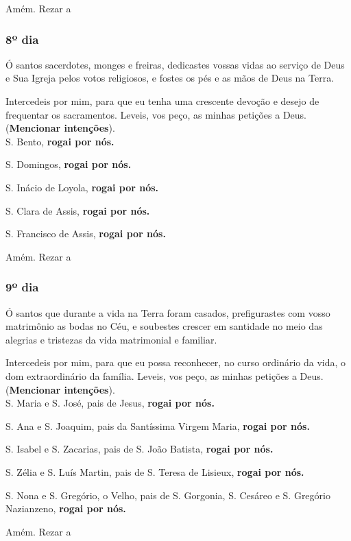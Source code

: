 \documentclass[a4paper,14pt]{extarticle} \usepackage[utf8]{inputenc}
\begin{document}
Amém. Rezar a 
\subsubsection{8º dia}

Ó santos sacerdotes, monges e freiras, dedicastes vossas vidas ao serviço de Deus e Sua Igreja pelos votos religiosos, e fostes os pés e as mãos de Deus na Terra.

Intercedeis por mim, para que eu tenha uma crescente devoção e desejo de frequentar os sacramentos. Leveis, vos peço, as minhas petições a Deus. (\textbf{Mencionar intenções}).\\

S. Bento, \textbf{rogai por nós.}

S. Domingos, \textbf{rogai por nós.}

S. Inácio de Loyola, \textbf{rogai por nós.}

S. Clara de Assis, \textbf{rogai por nós.}

S. Francisco de Assis, \textbf{rogai por nós.}

Amém. Rezar a 

\subsubsection{9º dia}

Ó santos que durante a vida na Terra foram casados, prefigurastes com vosso matrimônio as bodas no Céu, e soubestes crescer em santidade no meio das alegrias e tristezas da vida matrimonial e familiar.

Intercedeis por mim, para que eu possa reconhecer, no curso ordinário da vida, o dom extraordinário da família. Leveis, vos peço, as minhas petições a Deus. (\textbf{Mencionar intenções}).\\

S. Maria e S. José, pais de Jesus, \textbf{rogai por nós.}

S. Ana e S. Joaquim, pais da Santíssima Virgem Maria, \textbf{rogai por nós.}

S. Isabel e S. Zacarias, pais de S. João Batista, \textbf{rogai por nós.}

S. Zélia e S. Luís Martin, pais de S. Teresa de Lisieux, \textbf{rogai por nós.}

S. Nona e S. Gregório, o Velho, pais de S. Gorgonia, S. Cesáreo e S. Gregório Nazianzeno, \textbf{rogai por nós.}

Amém. Rezar a 
\end{document}

